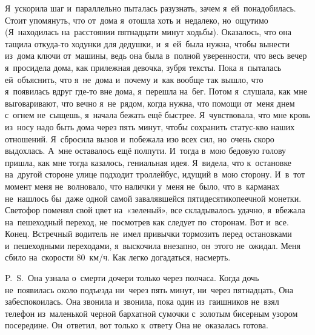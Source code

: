 Я~ускорила шаг и~параллельно пыталась разузнать, зачем я~ей~понадобилась.
Стоит упомянуть, что от~дома я~отошла хоть и~недалеко, но~ощутимо (Я~находилась на~расстоянии пятнадцати минут ходьбы).
Оказалось, что она тащила откуда-то ходунки для дедушки, и~я~ей~была нужна, чтобы вынести из~дома ключи от~машины, ведь она была в~полной уверенности, что весь вечер я~просидела дома, как прилежная девочка, зубря тексты.
Пока я~пыталась ей~объяснить, что я~не~дома и~почему и~как вообще так вышло, что я~появилась вдруг где-то вне дома, я~перешла на~бег.
Потом я~слушала, как мне выговаривают, что вечно я~не~рядом, когда нужна, что помощи от~меня днем с~огнем не~сыщешь, я~начала бежать ещё быстрее.
Я~чувствовала, что мне кровь из~носу надо быть дома через пять минут, чтобы сохранить статус-кво наших отношений.
Я~сбросила вызов и~побежала изо всех сил, но~очень скоро выдохлась.
А~мне оставалось ещё полпути.
И~тогда в~мою бедовую голову пришла, как мне тогда казалось, гениальная идея.
Я~видела, что к~остановке на~другой стороне улице подходит троллейбус, идущий в~мою сторону.
И~в~тот момент меня не~волновало, что налички у~меня не~было, что в~карманах не~нашлось бы~даже одной самой завалявшейся пятидесятикопеечной монетки.
Светофор поменял свой цвет на~«зеленый», все складывалось удачно, я~вбежала на~пешеходный переход, не~посмотрев как следует по~сторонам.
Вот и~все.
Конец.
Встречный водитель не~имел привычки тормозить перед остановками и~пешеходными переходами, я~выскочила внезапно, он~этого не~ожидал.
Меня сбило на~скорости 80~км/ч.
Как легко догадаться, насмерть.


\vspace{1cm}
P.~S.~Она узнала о~смерти дочери только через полчаса.
Когда дочь не~появилась около подъезда ни~через пять минут, ни~через пятнадцать, Она забеспокоилась.
Она звонила и~звонила, пока один из~гаишников не~взял телефон из~маленькой черной бархатной сумочки с~золотым бисерным узором посередине.
Он~ответил, вот только к~ответу Она не~оказалась готова.

